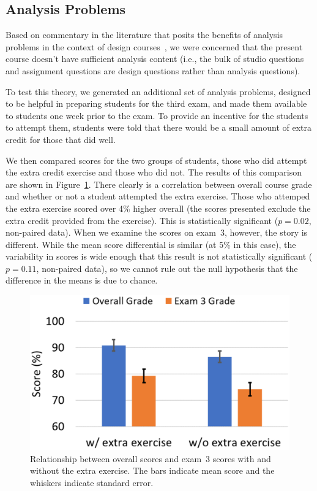 \subsection{Analysis Problems}

Based on commentary in the literature that posits the benefits of
analysis problems in the context of design courses~\cite{wjbo01},
we were concerned that the present
course doesn't have sufficient analysis content (i.e., the bulk of
studio questions and assignment questions are design questions rather
than analysis questions).

To test this theory, we generated an additional set of analysis problems,
designed to be helpful in preparing students for the third exam, and
made them available to students one week prior to the exam.  To provide
an incentive for the students to attempt them, students were told that
there would be a small amount of extra credit for those that did well.

We then compared scores for the two groups of students, those who did
attempt the extra credit exercise and those who did not.  The results
of this comparison are shown in Figure~\ref{fig:scores}.
There clearly is a correlation between overall course grade and
whether or not a student attempted the extra exercise.
Those who attemped the extra exercise scored over 4\% higher overall
(the scores presented exclude the extra credit provided from the
exercise).  This is statistically significant ($p = 0.02$, non-paired data).
When we examine the scores on exam~3, however, the story is different.
While the mean score differential is similar (at 5\% in this case), the
variability in scores is wide enough that this result is not
statistically significant ($p = 0.11$, non-paired data), so we cannot
rule out the null hypothesis that the difference in the means is
due to chance.

\begin{figure}[ht]
\centering
\includegraphics[width=0.5\columnwidth]{scores}
\caption{Relationship between overall scores and exam~3 scores
with and without the extra exercise. The bars indicate mean score and
the whiskers indicate standard error.}
\label{fig:scores}
\end{figure}

